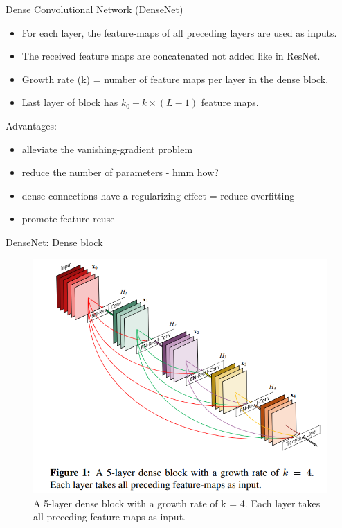 \documentclass{beamer}
\begin{document}
\begin{frame}{Dense Convolutional Network (DenseNet) }

\begin{itemize}
\item For each layer, the feature-maps of all preceding layers are
used as inputs.
\item The received feature maps are concatenated not added like in ResNet.
\item Growth rate (k) = number of feature maps per layer in the dense block.
\item Last layer of block has $k_0 + k \times (L - 1)$ feature maps.
\end{itemize}

\vfill

Advantages:

\begin{itemize}
\item alleviate the vanishing-gradient problem
\item reduce the number of parameters - hmm how?
\item dense connections have a regularizing effect = reduce overfitting
\item promote feature reuse
\end{itemize}

\end{frame}
\begin{frame}{DenseNet: Dense block }

\begin{figure}[h]
\includegraphics[scale=0.4]{img/denseBlock}
\caption{A 5-layer dense block with a growth rate of k = 4.
Each layer takes all preceding feature-maps as input.
 \cite{cit:ban}}
\end{figure}

\end{frame}
\end{document}
